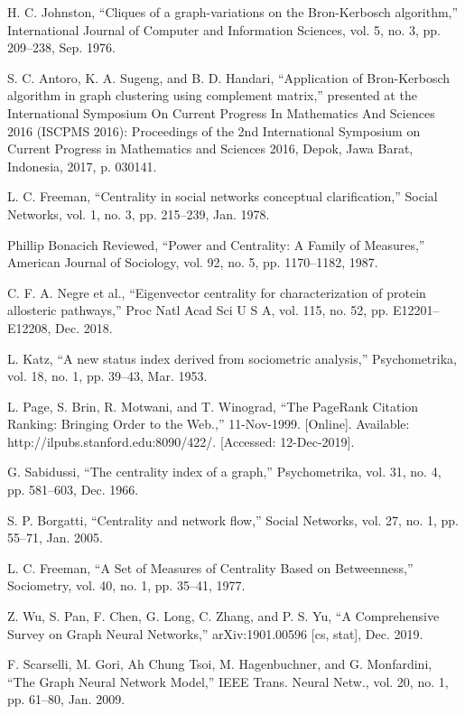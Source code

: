 \documentclass[journal,twoside,web]{ieeecolor}
\begin{document}
\begin{thebibliography}{9}
    H. C. Johnston, “Cliques of a graph-variations on the Bron-Kerbosch algorithm,” International Journal of Computer and Information Sciences, vol. 5, no. 3, pp. 209–238, Sep. 1976.
    
    S. C. Antoro, K. A. Sugeng, and B. D. Handari, “Application of Bron-Kerbosch algorithm in graph clustering using complement matrix,” presented at the International Symposium On Current Progress In Mathematics And Sciences 2016 (ISCPMS 2016): Proceedings of the 2nd International Symposium on Current Progress in Mathematics and Sciences 2016, Depok, Jawa Barat, Indonesia, 2017, p. 030141.
    
    L. C. Freeman, “Centrality in social networks conceptual clarification,” Social Networks, vol. 1, no. 3, pp. 215–239, Jan. 1978.
    
    Phillip Bonacich Reviewed, “Power and Centrality: A Family of Measures,” American Journal of Sociology, vol. 92, no. 5, pp. 1170–1182, 1987.
    
    C. F. A. Negre et al., “Eigenvector centrality for characterization of protein allosteric pathways,” Proc Natl Acad Sci U S A, vol. 115, no. 52, pp. E12201–E12208, Dec. 2018.
    
    L. Katz, “A new status index derived from sociometric analysis,” Psychometrika, vol. 18, no. 1, pp. 39–43, Mar. 1953.
    
    L. Page, S. Brin, R. Motwani, and T. Winograd, “The PageRank Citation Ranking: Bringing Order to the Web.,” 11-Nov-1999. [Online]. Available: http://ilpubs.stanford.edu:8090/422/. [Accessed: 12-Dec-2019].
    
    G. Sabidussi, “The centrality index of a graph,” Psychometrika, vol. 31, no. 4, pp. 581–603, Dec. 1966.
    
    S. P. Borgatti, “Centrality and network flow,” Social Networks, vol. 27, no. 1, pp. 55–71, Jan. 2005.
    
    L. C. Freeman, “A Set of Measures of Centrality Based on Betweenness,” Sociometry, vol. 40, no. 1, pp. 35–41, 1977.
    
    Z. Wu, S. Pan, F. Chen, G. Long, C. Zhang, and P. S. Yu, “A Comprehensive Survey on Graph Neural Networks,” arXiv:1901.00596 [cs, stat], Dec. 2019.
    
    F. Scarselli, M. Gori, Ah Chung Tsoi, M. Hagenbuchner, and G. Monfardini, “The Graph Neural Network Model,” IEEE Trans. Neural Netw., vol. 20, no. 1, pp. 61–80, Jan. 2009.
    

\end{thebibliography}
\end{document}

